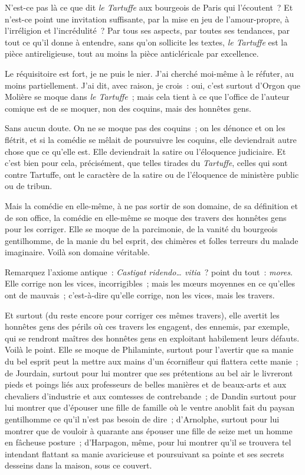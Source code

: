 \documentclass[french,twoside]{book} %
\begin{document}
 N’est-ce pas là ce que dit \emph{le Tartuffe} aux bourgeois de Paris qui l’écoutent ? Et n’est-ce point une invitation suffisante, par la mise en jeu de l’amour-propre, à l’irréligion et l’incrédulité ? Par tous ses aspects, par toutes ses tendances, par tout ce qu’il donne à entendre, sans qu’on sollicite les textes, \emph{le Tartuffe} est la pièce antireligieuse, tout au moins la pièce anticléricale par excellence.\par
Le réquisitoire est fort, je ne puis le nier. J’ai cherché moi-même à le réfuter, au moins partiellement. J’ai dit, avec raison, je crois : oui, c’est surtout d’Orgon que Molière se moque dans \emph{le Tartuffe} ; mais cela tient à ce que l’office de l’auteur comique est de se moquer, non des coquins, mais des honnêtes gens.\par
Sans aucun doute. On ne se moque pas des coquins ; on les dénonce et on les flétrit, et si la comédie se mêlait de poursuivre les coquins, elle deviendrait autre chose que ce qu’elle est. Elle deviendrait la satire ou l’éloquence judiciaire. Et c’est bien pour cela, précisément, que telles tirades du \emph{Tartuffe}, celles qui sont contre Tartuffe, ont le caractère de la satire ou de l’éloquence de ministère public ou de tribun.\par
Mais la comédie en elle-même, à ne pas sortir de son domaine, de sa définition et de son office, la comédie en elle-même se moque des travers des  honnêtes gens pour les corriger. Elle se moque de la parcimonie, de la vanité du bourgeois gentilhomme, de la manie du bel esprit, des chimères et folles terreurs du malade imaginaire. Voilà son domaine véritable.\par
Remarquez l’axiome antique : {\itshape Castigat ridendo… vitia} ? point du tout : {\itshape mores}. Elle corrige non les vices, incorrigibles ; mais les mœurs moyennes en ce qu’elles ont de mauvais ; c’est-à-dire qu’elle corrige, non les vices, mais les travers.\par
Et surtout (du reste encore pour corriger ces mêmes travers), elle avertit les honnêtes gens des périls où ces travers les engagent, des ennemis, par exemple, qui se rendront maîtres des honnêtes gens en exploitant habilement leurs défauts. Voilà le point. Elle se moque de Philaminte, surtout pour l’avertir que sa manie du bel esprit peut la mettre aux mains d’un écornifleur qui flattera cette manie ; de Jourdain, surtout pour lui montrer que ses prétentions au bel air le livreront pieds et poings liés aux professeurs de belles manières et de beaux-arts et aux chevaliers d’industrie et aux comtesses de contrebande ; de Dandin surtout pour lui montrer que d’épouser une fille de famille où le ventre anoblit fait du paysan gentilhomme ce qu’il n’est pas besoin de dire ;  d’Arnolphe, surtout pour lui montrer que de vouloir à quarante ans épouser une fille de seize met un homme en fâcheuse posture ; d’Harpagon, même, pour lui montrer qu’il se trouvera tel intendant flattant sa manie avaricieuse et poursuivant sa pointe et ses secrets desseins dans la maison, sous ce couvert.\par
\end{document}
